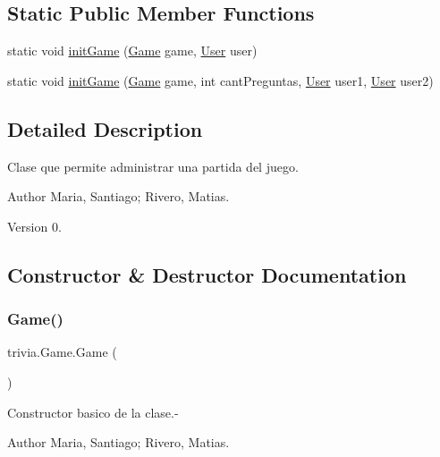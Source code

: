 \subsection*{Static Public Member Functions}
\begin{DoxyCompactItemize}
\item 
static void \mbox{\hyperlink{classtrivia_1_1Game_acff76e402d22f7d1b17c2f8c878ec9fc}{init\+Game}} (\mbox{\hyperlink{classtrivia_1_1Game}{Game}} game, \mbox{\hyperlink{classtrivia_1_1User}{User}} user)
\item 
static void \mbox{\hyperlink{classtrivia_1_1Game_ac78e285c8f07840b96bd4bba0d65869b}{init\+Game}} (\mbox{\hyperlink{classtrivia_1_1Game}{Game}} game, int cant\+Preguntas, \mbox{\hyperlink{classtrivia_1_1User}{User}} user1, \mbox{\hyperlink{classtrivia_1_1User}{User}} user2)
\end{DoxyCompactItemize}


\subsection{Detailed Description}
Clase que permite administrar una partida del juego. \begin{DoxyAuthor}{Author}
Maria, Santiago; Rivero, Matias. 
\end{DoxyAuthor}
\begin{DoxyVersion}{Version}
0. 
\end{DoxyVersion}


\subsection{Constructor \& Destructor Documentation}
\mbox{\label{classtrivia_1_1Game_ac0ed7c3b89cdb6936ada292648db5165}} 
\subsubsection{\texorpdfstring{Game()}{Game()}\hspace{0.1cm}{\footnotesize\ttfamily [1/3]}}
{\footnotesize\ttfamily trivia.\+Game.\+Game (\begin{DoxyParamCaption}{ }\end{DoxyParamCaption})\hspace{0.3cm}{\ttfamily [inline]}}

Constructor basico de la clase.-\/ \begin{DoxyAuthor}{Author}
Maria, Santiago; Rivero, Matias. 
\end{DoxyAuthor}
\mbox{\label{classtrivia_1_1Game_a66e59862c017262e9294558a9e024cbe}} 
